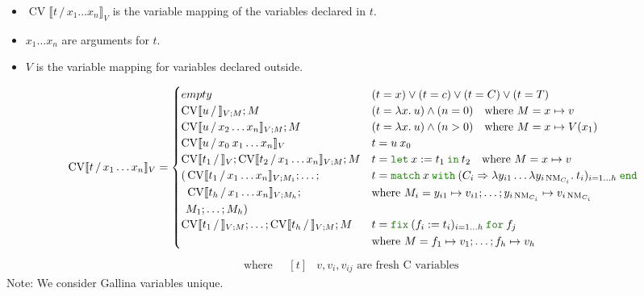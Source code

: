\documentclass[a4paper,fleqn]{article}
\def\gallina{\textrm{Gallina}}
\newcommand{\kwlet}{\mbox{\color{mygreen}\ttfamily let}}
\newcommand{\kwin}{\mbox{\color{mygreen}\ttfamily in}}
\newcommand{\kwmatch}{\mbox{\color{mygreen}\ttfamily match}}
\newcommand{\kwwith}{\mbox{\color{mygreen}\ttfamily with}}
\newcommand{\kwend}{\mbox{\color{mygreen}\ttfamily end}}
\newcommand{\kwfix}{\mbox{\color{mygreen}\ttfamily fix}}
\newcommand{\kwfor}{\mbox{\color{mygreen}\ttfamily for}}
\newcommand{\lam}[2]{\lambda #1.\:#2}
\newcommand{\lamB}[1]{\lambda #1.\:}
\newcommand{\letin}[3]{\kwlet\:#1:=#2\:\kwin\:#3}
\newcommand{\match}[4]{\kwmatch\:#1\:\kwwith\:(#2 \Rightarrow #3)_{#4}\:\kwend}
\newcommand{\fix}[4]{\kwfix\:(#1 := #2)_{#3}\:\kwfor\:#4}
\DeclareMathOperator{\NM}{NM} %
\newcommand{\BRA}[1]{\llbracket #1 \rrbracket}
\DeclareMathOperator{\cvop}{CV}
\newcommand{\cv}[3]{\cvop\BRA{#1\,/\,#2}_{#3}}
\begin{document}
\begin{itemize}
  \item $\cv{t}{x_1\ldots x_n}{V}$ is the variable mapping of the variables declared in $t$.
  \item $x_1\ldots x_n$ are arguments for $t$.
  \item $V$ is the variable mapping for variables declared outside.
\end{itemize}
\[
  \cv{t}{x_1\ldots x_n}{V} =
  \begin{cases}
    empty                                             & (t = x) \vee (t = c) \vee (t = C) \vee (t = T) \\
    \cv{u}{}{V; M}; M                                & (t = \lam{x}{u}) \wedge (n = 0) \quad \text{where}~M = x\mapsto v \\
    \cv{u}{x_2\ldots x_n}{V; M}; M                    & (t = \lam{x}{u}) \wedge (n > 0) \quad \text{where}~M = x\mapsto V(x_1) \\
    \cv{u}{x_0\:x_1\ldots x_n}V                        & t = u\:x_0 \\
    \cv{t_1}{}{V}; \cv{t_2}{x_1\ldots x_n}{V; M}; M    & t = \letin{x}{t_1}{t_2} \quad \text{where}~M = x\mapsto v \\
    \begin{aligned}[t]
      (&\cv{t_1}{x_1\ldots x_n}{V;M_1};\ldots; \\
       &\cv{t_h}{x_1\ldots x_n}{V;M_h}; \\
       &M_1;\ldots;M_h)
    \end{aligned} &                                   \begin{aligned}[t]
                                                        &t = \match{x}{C_i}{\lambda y_{i1}\ldots\lamB{y_{i\NM_{C_i}}}t_i}{i=1\ldots h} \\
                                                        &\text{where}~M_i = y_{i1}\mapsto v_{i1}; \ldots; y_{i\NM_{C_i}}\mapsto v_{i\NM_{C_i}}
                                                      \end{aligned} \\
    \cv{t_1}{}{V;M}; \ldots; \cv{t_h}{}{V;M}; M &    \begin{aligned}[t]
                                                        &t = \fix{f_i}{t_i}{i=1\ldots h}{f_j} \\
                                                        &\text{where}~M = f_1\mapsto v_1;\ldots; f_h\mapsto v_h
                                                      \end{aligned}
  \end{cases}
\]
\[ \text{where} \quad
  \begin{aligned}[t]
    & \text{$v, v_i, v_{ij}$ are fresh C variables}
  \end{aligned}
\]
{\small Note: \quad We consider \gallina{} variables unique.}
\end{document}
